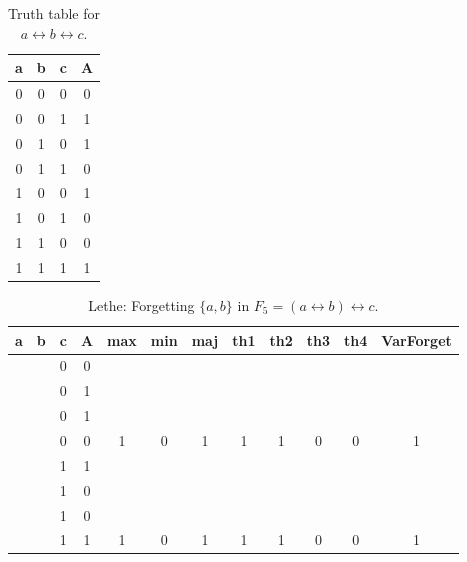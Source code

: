 \begin{table}[!tb]
    \centering
    \begin{tabular}{|c|c|c|c|}
        \hline
        \textbf{a} & \textbf{b} & \textbf{c} & \textbf{A} \\ \hline
        0 & 0 & 0 & 0 \\ \hline
        0 & 0 & 1 & 1 \\ \hline
        0 & 1 & 0 & 1 \\ \hline
        0 & 1 & 1 & 0 \\ \hline
        1 & 0 & 0 & 1 \\ \hline
        1 & 0 & 1 & 0 \\ \hline
        1 & 1 & 0 & 0 \\ \hline
        1 & 1 & 1 & 1 \\ \hline
    \end{tabular}
    \caption{Truth table for $a \leftrightarrow b \leftrightarrow c$.}
    \label{tab:truthtab}
\end{table}

\begin{table}[!tb]
    \centering
    \begin{tabular}{|c|c|c|c|c|c|c|c|c|c|c|c|}
        \hline
        \textbf{a} & \textbf{b} & \textbf{c} & \textbf{A} & \textbf{max} & \textbf{min} & \textbf{maj} & \textbf{th1} & \textbf{th2} & \textbf{th3} & \textbf{th4} & \textbf{VarForget} \\ \hline
        \rowcolor{gray!40}  &  & 0 & 0 &  &  &  &  &  &  &  &  \\ \hline
        \rowcolor{gray!40}  &  & 0 & 1 &  &  &  &  &  &  &  &  \\ \hline
        \rowcolor{gray!40}  &  & 0 & 1 &  &  &  &  &  &  &  &  \\ \hline
        \rowcolor{gray!40}  &  & 0 & 0 & 1 & 0 & 1 & 1 & 1 & 0 & 0 & 1 \\ \hline
        \rowcolor{blue!40}  &  & 1 & 1 &  &  &  &  &  &  &  &  \\ \hline
        \rowcolor{blue!40}  &  & 1 & 0 &  &  &  &  &  &  &  &  \\ \hline
        \rowcolor{blue!40}  &  & 1 & 0 &  &  &  &  &  &  &  &  \\ \hline
        \rowcolor{blue!40}  &  & 1 & 1 & 1 & 0 & 1 & 1 & 1 & 0 & 0 & 1 \\ \hline
    \end{tabular}
    \caption{Lethe: Forgetting $\{a, b\}$ in $F_{5} = (a \leftrightarrow b) \leftrightarrow c$.}
    \label{tab:lethe-F5-ab}
\end{table}
